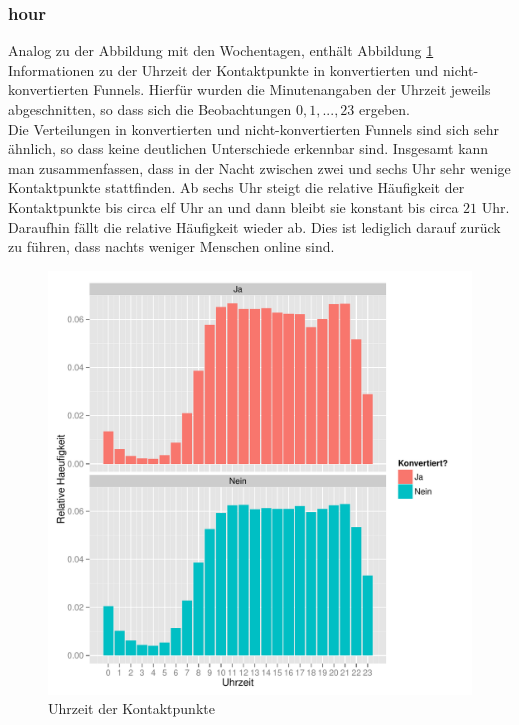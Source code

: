 \subsubsection*{hour}
Analog zu der Abbildung mit den Wochentagen, enthält Abbildung \ref{hour} Informationen zu der Uhrzeit der Kontaktpunkte in konvertierten und nicht-konvertierten Funnels. Hierfür wurden die Minutenangaben der Uhrzeit jeweils abgeschnitten, so dass sich die Beobachtungen $0,1,...,23$ ergeben.\\
Die Verteilungen in konvertierten und nicht-konvertierten Funnels sind sich sehr ähnlich, so dass keine deutlichen Unterschiede erkennbar sind. Insgesamt kann man zusammenfassen, dass in der Nacht zwischen zwei und sechs Uhr sehr wenige Kontaktpunkte stattfinden. Ab sechs Uhr steigt die relative Häufigkeit der Kontaktpunkte bis circa elf Uhr an und dann bleibt sie konstant bis circa $21$ Uhr. Daraufhin fällt die relative Häufigkeit wieder ab. Dies ist lediglich darauf zurück zu führen, dass nachts weniger Menschen online sind.

\begin{figure}[H]
    \centering
    \includegraphics[scale=0.5]{hour.pdf}
    \caption{Uhrzeit der Kontaktpunkte}
    \label{hour}
\end{figure}

